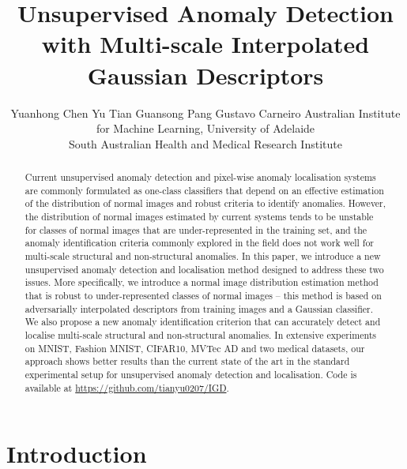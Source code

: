 \documentclass[final]{cvpr}
\begin{document}
\title{Unsupervised Anomaly Detection with Multi-scale Interpolated Gaussian Descriptors}
\newcommand\samethanks[1][\value{footnote}]{\footnotemark[#1]}


\newcommand{\bblue}[1]{\textcolor{blue}{\textbf{#1}}}
\newcommand{\bred}[1]{\textcolor{red}{\textbf{#1}}}

\author{\parbox{.8\linewidth}{\centering Yuanhong Chen   Yu Tian  Guansong Pang    Gustavo Carneiro    Australian Institute for Machine Learning, University of Adelaide \\
  South Australian Health and Medical Research Institute \\
} 
}



\maketitle


\begin{abstract}
Current unsupervised anomaly detection and pixel-wise anomaly localisation systems are commonly formulated as one-class classifiers that depend on an effective estimation of the distribution of normal images and robust criteria to identify anomalies.
However, the distribution of normal images estimated by current systems tends to be unstable for classes of normal images that are under-represented in the training set, and the anomaly identification criteria commonly explored in the field does not work well for multi-scale structural and non-structural anomalies. 
In this paper, we introduce a new unsupervised anomaly detection and localisation method designed to address these two issues.
More specifically, we introduce a normal image distribution estimation method that is robust 
to under-represented classes of normal images -- this method is based on adversarially interpolated descriptors from training images and a Gaussian classifier. 
We also propose a new anomaly identification criterion that can accurately detect and localise multi-scale structural and non-structural anomalies.
In extensive experiments on MNIST, Fashion MNIST, CIFAR10, MVTec AD and two medical datasets, our approach shows better results than the current state of the art in the standard experimental setup for unsupervised anomaly detection and localisation. 
Code is available at \url{https://github.com/tianyu0207/IGD}.  \end{abstract}

\section{Introduction}
\end{document}
